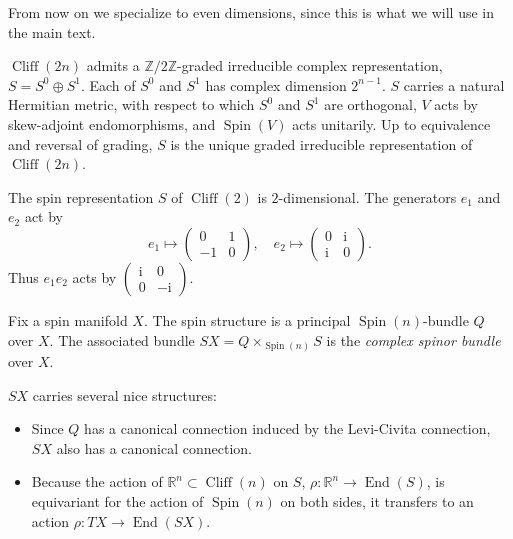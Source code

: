 \documentclass[12pt,letterpaper,reqno]{article}
\numberwithin{equation}{section}
\newcommand{\R}{\ensuremath{\mathbb R}}
\newcommand{\Z}{\ensuremath{\mathbb Z}}
\newcommand{\I}{{\mathrm i}}
\newcommand{\ti}[1]{\textit{#1}}
\DeclareMathOperator{\End}{End}
\DeclareMathOperator{\Spin}{Spin}
\DeclareMathOperator{\Cliff}{Cliff}
\begin{document}
From now on we specialize to even dimensions, since this is what we will use in
the main text.

\begin{prop} 
$\Cliff(2n)$ admits a $\Z/2\Z$-graded irreducible complex representation, $S = S^0 \oplus S^1$. 
Each of $S^0$ and $S^1$ has complex dimension $2^{n-1}$. $S$ carries a natural Hermitian 
metric, with respect to which $S^0$ and $S^1$ are orthogonal, $V$ 
acts by skew-adjoint endomorphisms, 
and $\Spin(V)$ acts unitarily.
Up to equivalence and reversal of grading, $S$ is the unique graded irreducible representation
of $\Cliff(2n)$.
\end{prop}

\begin{example} The spin representation 
$S$ of $\Cliff(2)$ is $2$-dimensional. The generators $e_1$ and $e_2$ act by
\begin{equation}
  e_1 \mapsto \begin{pmatrix} 0 & 1 \\ -1 & 0 \end{pmatrix}, \quad   e_2 \mapsto \begin{pmatrix} 0 & \I \\ \I & 0 \end{pmatrix}.
\end{equation}
Thus $e_1 e_2$ acts by $\begin{pmatrix} \I & 0 \\ 0 & -\I \end{pmatrix}$.
\end{example}

\begin{defn} Fix a spin manifold $X$. The spin structure is 
a principal $\Spin(n)$-bundle $Q$ over $X$.
The associated bundle $SX = Q \times_{\Spin(n)} S$ is the \ti{complex spinor bundle} over $X$.
\end{defn}

$SX$ carries several nice structures: 
\begin{itemize}
\item Since $Q$ has a canonical connection induced by the
Levi-Civita connection, $SX$ also has a canonical connection.
\item
Because the action of $\R^n \subset \Cliff(n)$ on $S$,
$\rho: \R^n \to \End(S)$, is
equivariant for the action of $\Spin(n)$ on both sides,
it transfers to an action $\rho: TX \to \End(SX)$.
\end{itemize}
\end{document}
